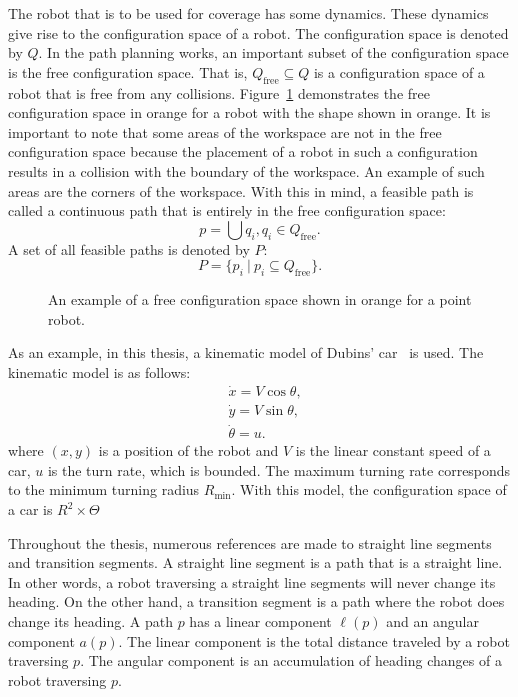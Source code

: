 \documentclass[../main.tex]{subfiles}
\begin{document}
The robot that is to be used for coverage has some dynamics. These dynamics give rise to the configuration space of a robot. The configuration space is denoted by $Q$. In the path planning works, an important subset of the configuration space is the free configuration space. That is, $Q_{\text{free}}\subseteq Q$ is a configuration space of a robot that is free from any collisions. Figure~\ref{fig:configuration_space} demonstrates the free configuration space in orange for a robot with the shape shown in orange. It is important to note that some areas of the workspace are not in the free configuration space because the placement of a robot in such a configuration results in a collision with the boundary of the workspace. An example of such areas are the corners of the workspace. With this in mind, a feasible path is called a continuous path that is entirely in the free configuration space:
\begin{equation}
	p=\bigcup q_i, q_i\in Q_{\text{free}}.
\end{equation}
A set of all feasible paths is denoted by $P$:
\begin{equation}
	P=\{p_i\ |\ p_i\subseteq Q_{\text{free}}\}.
\end{equation}

\begin{figure}
	\centering
	
	\caption{An example of a free configuration space shown in orange for a point robot.}
	\label{fig:configuration_space}
\end{figure}

As an example, in this thesis, a kinematic model of Dubins' car~\cite{dubins1957curves} is used. The kinematic model is as follows:
\begin{equation}
	\begin{aligned}
		& \dot{x}=V\cos{\theta},\\
		& \dot{y}=V\sin{\theta},\\
		& \dot{\theta}=u.
	\end{aligned}
\end{equation}
where $(x,y)$ is a position of the robot and $V$ is the linear constant speed of a car, $u$ is the turn rate, which is bounded. The maximum turning rate corresponds to the minimum turning radius $R_{\min}$. With this model, the configuration space of a car is $R^2\times\Theta$

Throughout the thesis, numerous references are made to straight line segments and transition segments. A straight line segment is a path that is a straight line. In other words, a robot traversing a straight line segments will never change its heading. On the other hand, a transition segment is a path where the robot does change its heading. A path $p$ has a linear component $\ell(p)$ and an angular component $a(p)$. The linear component is the total distance traveled by a robot traversing $p$. The angular component is an accumulation of heading changes of a robot traversing $p$.
\end{document}
